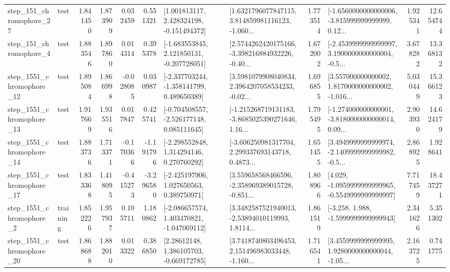 \begin{tabular}{llrrrrllrlrr}
  step\_151\_chromophore\_27 &      test &      1.841450 &    1.873909 &      0.032459 &  0.551321 &    [1.001813117, 2.428324198, -0.151494372] &  [1.6321796077847115, 3.814859981116123, -1.060... &       1.773514 &  [-1.6560000000000006, -3.815999999999999, 0.12... &            1.925341 &         12.654744 \\
   step\_151\_chromophore\_4 &      test &      1.883546 &    1.897860 &      0.014314 &  0.395378 &   [-1.683553845, 2.121850131, -0.207728051] &  [2.5744262420175166, -3.398216884932226, -0.40... &       1.672002 &  [-2.4539999999999997, 3.1900000000000004, -0.5... &            3.678282 &         13.368132 \\
 step\_1551\_chromophore\_12 &      test &      1.895084 &    1.866998 &     -0.028085 &  0.030987 &   [-2.337703244, -1.358141799, 0.489650389] &  [3.5981079908040834, 2.3964207058534233, -0.02... &       1.696855 &  [3.557000000000002, 1.8170000000000002, -1.016... &            5.030449 &         15.366123 \\
 step\_1551\_chromophore\_13 &      test &      1.917669 &    1.935516 &      0.017847 &  0.425741 &   [-0.704508557, -2.526177148, 0.085111645] &  [-1.215268719131183, -3.8685025390271646, 1.16... &       1.795495 &  [-1.274000000000001, -3.8180000000000014, 0.09... &            2.903930 &         14.624179 \\
 step\_1551\_chromophore\_14 &      test &      1.883736 &    1.713371 &     -0.170366 & -1.191796 &    [-2.298552848, 1.314294146, 0.270760292] &  [-3.606250981317704, 2.299337693143718, 0.4873... &       1.651455 &  [3.4949999999999974, -2.1409999999999982, -0.5... &            2.868925 &          1.928641 \\
 step\_1551\_chromophore\_17 &      test &      1.833368 &    1.418095 &     -0.415273 & -3.296580 &    [-2.425197906, 1.027650563, 0.389750971] &  [3.559658568466596, -2.358969389015728, -0.851... &       1.808966 &  [4.029, -1.0959999999999965, -0.5549999999999997] &            7.717459 &         18.437271 \\
  step\_1551\_chromophore\_2 &  training &      1.852226 &    1.957937 &      0.105711 &  1.180862 &   [-2.086657574, 1.403470821, -1.047069112] &  [3.3482587521940013, -2.53894010119993, 1.8114... &       1.861519 &               [-3.258, 1.988, -1.5999999999999943] &            2.341626 &          5.351302 \\
 step\_1551\_chromophore\_20 &      test &      1.868688 &    1.882010 &      0.013322 &  0.386850 &     [2.28612148, 1.386105703, -0.669172785] &  [3.7418740803496453, 2.151496983033448, -1.160... &       1.716541 &  [3.4559999999999995, 1.9280000000000044, -1.05... &            2.163725 &          0.741775 \\

\end{tabular}
